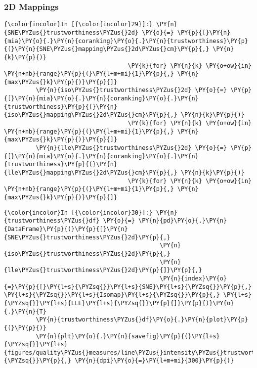     \subsubsection{2D Mappings}\label{d-mappings}

    \begin{Verbatim}[commandchars=\\\{\}]
{\color{incolor}In [{\color{incolor}29}]:} \PY{n}{SNE\PYZus{}trustworthiness\PYZus{}2d} \PY{o}{=} \PY{p}{[}\PY{n}{mia}\PY{o}{.}\PY{n}{coranking}\PY{o}{.}\PY{n}{trustworthiness}\PY{p}{(}\PY{n}{SNE\PYZus{}mapping\PYZus{}2d\PYZus{}cm}\PY{p}{,} \PY{n}{k}\PY{p}{)}
                                   \PY{k}{for} \PY{n}{k} \PY{o+ow}{in} \PY{n+nb}{range}\PY{p}{(}\PY{l+m+mi}{1}\PY{p}{,} \PY{n}{max\PYZus{}k}\PY{p}{)}\PY{p}{]}
         \PY{n}{iso\PYZus{}trustworthiness\PYZus{}2d} \PY{o}{=} \PY{p}{[}\PY{n}{mia}\PY{o}{.}\PY{n}{coranking}\PY{o}{.}\PY{n}{trustworthiness}\PY{p}{(}\PY{n}{iso\PYZus{}mapping\PYZus{}2d\PYZus{}cm}\PY{p}{,} \PY{n}{k}\PY{p}{)}
                                   \PY{k}{for} \PY{n}{k} \PY{o+ow}{in} \PY{n+nb}{range}\PY{p}{(}\PY{l+m+mi}{1}\PY{p}{,} \PY{n}{max\PYZus{}k}\PY{p}{)}\PY{p}{]}
         \PY{n}{lle\PYZus{}trustworthiness\PYZus{}2d} \PY{o}{=} \PY{p}{[}\PY{n}{mia}\PY{o}{.}\PY{n}{coranking}\PY{o}{.}\PY{n}{trustworthiness}\PY{p}{(}\PY{n}{lle\PYZus{}mapping\PYZus{}2d\PYZus{}cm}\PY{p}{,} \PY{n}{k}\PY{p}{)}
                                   \PY{k}{for} \PY{n}{k} \PY{o+ow}{in} \PY{n+nb}{range}\PY{p}{(}\PY{l+m+mi}{1}\PY{p}{,} \PY{n}{max\PYZus{}k}\PY{p}{)}\PY{p}{]}
\end{Verbatim}

    \begin{Verbatim}[commandchars=\\\{\}]
{\color{incolor}In [{\color{incolor}30}]:} \PY{n}{trustworthiness\PYZus{}df} \PY{o}{=} \PY{n}{pd}\PY{o}{.}\PY{n}{DataFrame}\PY{p}{(}\PY{p}{[}\PY{n}{SNE\PYZus{}trustworthiness\PYZus{}2d}\PY{p}{,}
                                            \PY{n}{iso\PYZus{}trustworthiness\PYZus{}2d}\PY{p}{,}
                                            \PY{n}{lle\PYZus{}trustworthiness\PYZus{}2d}\PY{p}{]}\PY{p}{,}
                                            \PY{n}{index}\PY{o}{=}\PY{p}{[}\PY{l+s}{\PYZsq{}}\PY{l+s}{SNE}\PY{l+s}{\PYZsq{}}\PY{p}{,} \PY{l+s}{\PYZsq{}}\PY{l+s}{Isomap}\PY{l+s}{\PYZsq{}}\PY{p}{,} \PY{l+s}{\PYZsq{}}\PY{l+s}{LLE}\PY{l+s}{\PYZsq{}}\PY{p}{]}\PY{p}{)}\PY{o}{.}\PY{n}{T}
         \PY{n}{trustworthiness\PYZus{}df}\PY{o}{.}\PY{n}{plot}\PY{p}{(}\PY{p}{)}
         \PY{n}{plt}\PY{o}{.}\PY{n}{savefig}\PY{p}{(}\PY{l+s}{\PYZsq{}}\PY{l+s}{figures/quality\PYZus{}measures/line\PYZus{}intensity\PYZus{}trustworthiness\PYZus{}2d.png}\PY{l+s}{\PYZsq{}}\PY{p}{,} \PY{n}{dpi}\PY{o}{=}\PY{l+m+mi}{300}\PY{p}{)}
\end{Verbatim}

